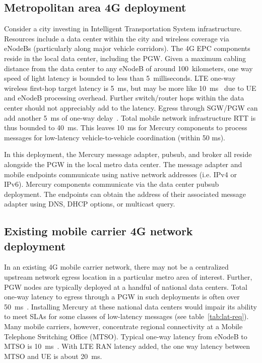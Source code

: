 \subsection{Metropolitan area 4G deployment}
\label{sec:metro-deploy}

Consider a city investing in Intelligent Transportation System
infrastructure. Resources include a data center within the city and
wireless coverage via eNodeBs (particularly along major vehicle
corridors). The 4G EPC components reside in the local data center,
including the PGW.  Given a maximum cabling distance from the data
center to any eNodeB of around 100~kilometers, one way speed of light
latency is bounded to less than 5~milliseconds.  LTE one-way wireless
first-hop target latency is 5~ms, but may be more like
10~ms~\cite{RAN-latency} due to UE and eNodeB processing overhead.
Further switch/router hops within the data center should not
appreciably add to the latency. Egress through SGW/PGW can add another
5~ms of one-way delay~\cite{EPC-latency}.  Total mobile network
infrastructure RTT is thus bounded to 40~ms. This leaves 10~ms for
Mercury components to process messages for low-latency
vehicle-to-vehicle coordination (within 50 ms).

In this deployment, the Mercury message adapter, pubsub, and broker
all reside alongside the PGW in the local metro data center. The
message adapter and mobile endpoints communicate using native network
addresses (i.e. IPv4 or IPv6).  Mercury components communicate via the
data center pubsub deployment. The endpoints can obtain the address
of their associated message adapter using DNS, DHCP options, or
multicast query.

\subsection{Existing mobile carrier 4G network deployment}

In an existing 4G mobile carrier network, there may not be a
centralized upstream network egress location in a particular metro
area of interest. Further, PGW nodes are typically deployed at a
handful of national data centers.  Total one-way latency to egress
through a PGW in such deployments is often over
50~ms~\cite{carrier-latency}. Installing Mercury at these national
data centers would impair its ability to meet SLAs for some classes of
low-latency messages (see table~\ref{tab:lat-req}). Many mobile
carriers, however, concentrate regional connectivity at a Mobile
Telephone Switching Office (MTSO).  Typical one-way latency from
eNodeB to MTSO is 10~ms~\cite{cho2014smore}. With LTE RAN latency
added, the one way latency between MTSO and UE is about 20~ms.


